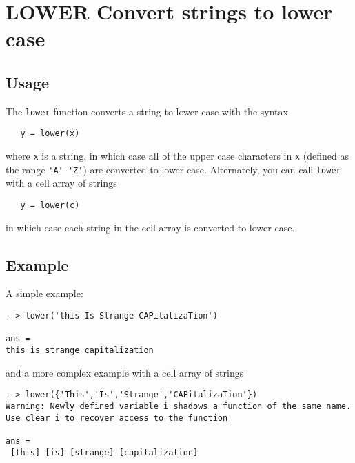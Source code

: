 \section{LOWER Convert strings to lower case}

\subsection{Usage}

The \verb|lower| function converts a string to lower case with
the syntax
\begin{verbatim}
   y = lower(x)
\end{verbatim}
where \verb|x| is a string, in which case all of the upper case
characters in \verb|x| (defined as the range \verb|'A'-'Z'|) are
converted to lower case.  Alternately, you can call \verb|lower|
with a cell array of strings
\begin{verbatim}
   y = lower(c)
\end{verbatim}
in which case each string in the cell array is converted to lower case.
\subsection{Example}

A simple example:
\begin{verbatim}
--> lower('this Is Strange CAPitalizaTion')

ans = 
this is strange capitalization
\end{verbatim}
and a more complex example with a cell array of strings
\begin{verbatim}
--> lower({'This','Is','Strange','CAPitalizaTion'})
Warning: Newly defined variable i shadows a function of the same name.  Use clear i to recover access to the function

ans = 
 [this] [is] [strange] [capitalization] 
\end{verbatim}
